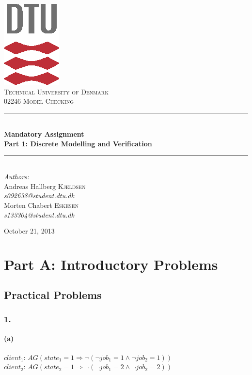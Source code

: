 \documentclass[12pt]{report}
\newcommand{\HRule}{\rule{\linewidth}{0.5mm}}
\begin{document}
\begin{titlepage}
\begin{center}

\includegraphics[scale=2.0]{dtu_logo_cmyk.eps}\\[1cm]

\textsc{\LARGE Technical University of Denmark}\\[1.5cm]

\textsc{\Large 02246 Model Checking}\\[0.5cm]


\HRule \\[0.4cm]
{\huge \bfseries Mandatory Assignment\\Part 1: Discrete Modelling and Verification}\\[0.1cm]
\HRule \\[1.5cm]

\large
\emph{Authors:}
\\[10pt]
Andreas Hallberg \textsc{Kjeldsen}\\
\emph{s092638@student.dtu.dk}
\\[10pt]
Morten Chabert \textsc{Eskesen}\\
\emph{s133304@student.dtu.dk}

\vfill

{\large October 21, 2013}

\end{center}
\end{titlepage}
\chapter*{Part A: Introductory Problems}
\section*{Practical Problems}
\subsection*{1.}
\subsubsection*{(a)}
$client_1$: $AG (state_1 = 1 \Rightarrow \neg(\neg job_1 = 1 \wedge \neg job_2 = 1))$\\
$client_2$: $AG (state_2 = 1 \Rightarrow \neg(\neg job_1 = 2 \wedge \neg job_2 = 2))$
\end{document}
